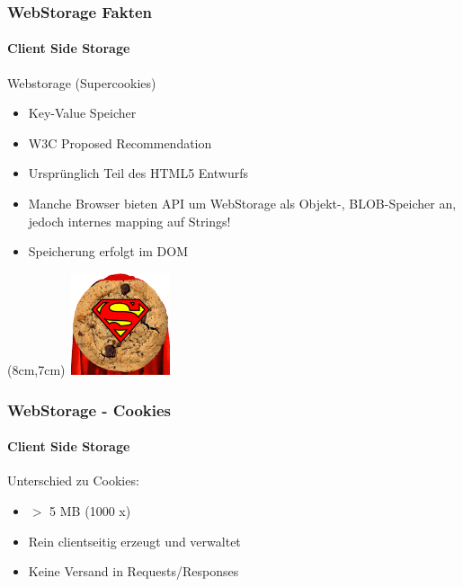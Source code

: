 \begin{frame}
\frametitle{WebStorage Fakten}
\framesubtitle{Client Side Storage}
	Webstorage (Supercookies)
	\begin{itemize}
		\item Key-Value Speicher
		\item W3C Proposed Recommendation
		\item Ursprünglich Teil des HTML5 Entwurfs
		\item Manche Browser bieten API um WebStorage als Objekt-, BLOB-Speicher an, jedoch internes mapping auf Strings!
		\item Speicherung erfolgt im DOM
	\end{itemize}
	\begin{textblock*}{3cm}(8cm,7cm) %
		\includegraphics[height=3cm,width=3cm]{img/SuperCookie.png}
	\end{textblock*}
\end{frame}
\begin{frame}
\frametitle{WebStorage - Cookies}
\framesubtitle{Client Side Storage}
	Unterschied zu Cookies:
	\begin{itemize}
		\item $>$ 5 MB (1000 x)
		\item Rein clientseitig erzeugt und verwaltet
		\item Keine Versand in Requests/Responses
	\end{itemize}
\end{frame}
